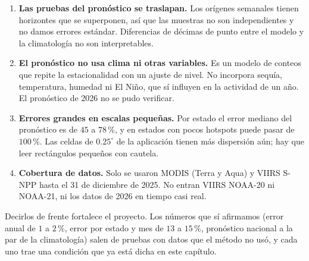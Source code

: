 \begin{enumerate}[label=\arabic*.]
  \item \textbf{Las pruebas del pronóstico se traslapan.} Los orígenes semanales tienen horizontes que se superponen, así que las muestras no son independientes y no damos errores estándar. Diferencias de décimas de punto entre el modelo y la climatología no son interpretables.

  \item \textbf{El pronóstico no usa clima ni otras variables.} Es un modelo de conteos que repite la estacionalidad con un ajuste de nivel. No incorpora sequía, temperatura, humedad ni El Niño, que sí influyen en la actividad de un año. El pronóstico de 2026 no se pudo verificar.

  \item \textbf{Errores grandes en escalas pequeñas.} Por estado el error mediano del pronóstico es de $45$ a $78\,\%$, y en estados con pocos hotspots puede pasar de $100\,\%$. Las celdas de $0.25^\circ$ de la aplicación tienen más dispersión aún; hay que leer rectángulos pequeños con cautela.

  \item \textbf{Cobertura de datos.} Solo se usaron MODIS (Terra y Aqua) y VIIRS S-NPP hasta el 31 de diciembre de 2025. No entran VIIRS NOAA-20 ni NOAA-21, ni los datos de 2026 en tiempo casi real.
\end{enumerate}

\begin{ideaclave}
Decirlos de frente fortalece el proyecto. Los números que sí afirmamos (error anual de $1$ a $2\,\%$, error por estado y mes de $13$ a $15\,\%$, pronóstico nacional a la par de la climatología) salen de pruebas con datos que el método no usó, y cada uno trae una condición que ya está dicha en este capítulo.
\end{ideaclave}
